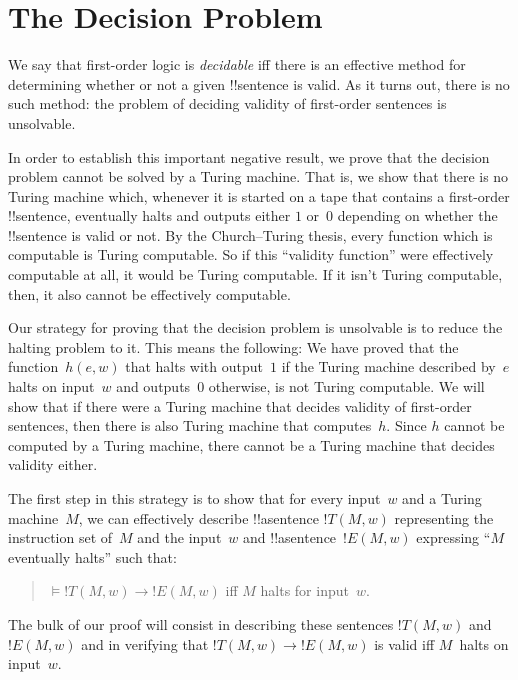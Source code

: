 \documentclass[10pt,a4paper]{article}
\theoremstyle{plain}
\theoremstyle{definition}
\theoremstyle{remark}
\newcommand*{\olfileid}[3]{}
\newcommand*{\olsection}[1]{\section*{#1}}
\providecommand{\lif}{\mathbin{\rightarrow}}
\providecommand{\Entails}{\mathrel{\models}}
\begin{document}



\olfileid{tur}{und}{dec}
\olsection{The Decision Problem}

We say that first-order logic is \emph{decidable} iff there is an
effective method for determining whether or not a given !!{sentence}
is valid. As it turns out, there is no such method: the problem of
deciding validity of first-order sentences is unsolvable.

In order to establish this important negative result, we prove that
the decision problem cannot be solved by a Turing machine.  That is,
we show that there is no Turing machine which, whenever it is started
on a tape that contains a first-order !!{sentence}, eventually halts
and outputs either $1$ or~$0$ depending on whether the
!!{sentence} is valid or not. By the Church--Turing thesis, every
function which is computable is Turing computable. So if this
``validity function'' were effectively computable at all, it would be
Turing computable. If it isn't Turing computable, then, it also cannot
be effectively computable.

Our strategy for proving that the decision problem is unsolvable is to
reduce the halting problem to it.  This means the following: We have
proved that the function~$h(e,w)$ that halts with output~$1$ if the
Turing machine described by~$e$ halts on input~$w$ and outputs~$0$
otherwise, is not Turing computable.  We will show that if there were
a Turing machine that decides validity of first-order sentences, then
there is also Turing machine that computes~$h$.  Since $h$ cannot be
computed by a Turing machine, there cannot be a Turing machine that
decides validity either.

The first step in this strategy is to show that for every input~$w$
and a Turing machine~$M$, we can effectively describe !!a{sentence}
$!T(M, w)$ representing the instruction set of~$M$ and the input~$w$
and !!a{sentence}~$!E(M, w)$ expressing ``$M$ eventually halts'' such
that:
\begin{quote}
  $\Entails !T(M, w) \lif !E(M,w)$ iff $M$ halts for input~$w$.
\end{quote}
The bulk of our proof will consist in describing these sentences
$!T(M, w)$ and~$!E(M, w)$ and in verifying that $!T(M, w) \lif !E(M, w)$
is valid iff $M$~halts on input~$w$.
\end{document}
